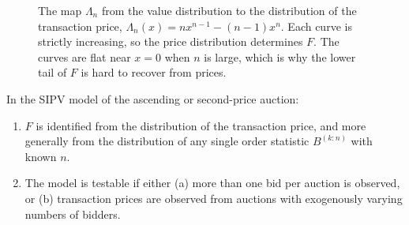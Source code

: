 \begin{figure}[htbp]
\centering
{}
\caption{The map $\Lambda_n$ from the value distribution to the distribution of the transaction price,
$\Lambda_n(x)=nx^{n-1}-(n-1)x^n$. Each curve is strictly increasing, so the price distribution determines $F$. The
curves are flat near $x=0$ when $n$ is large, which is why the lower tail of $F$ is hard to recover from prices.}
\label{fig:15-lambda}
\end{figure}

\begin{theorem}\label{thm:15-ah1}
In the SIPV model of the ascending or second-price auction:
\begin{enumerate}[label=(\roman*)]
\item $F$ is identified from the distribution of the transaction price, and more generally from the distribution of
any single order statistic $B^{(k:n)}$ with known $n$.
\item The model is testable if either (a) more than one bid per auction is observed, or (b) transaction prices are
observed from auctions with exogenously varying numbers of bidders.
\end{enumerate}
\end{theorem}


